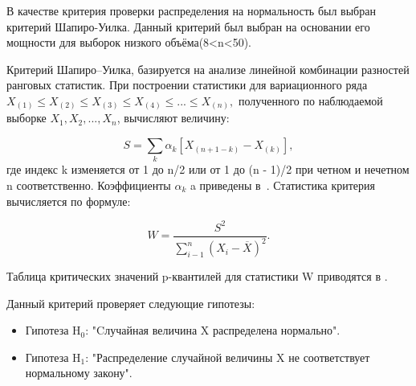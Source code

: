 В качестве критерия проверки распределения на нормальность был выбран критерий Шапиро-Уилка. Данный критерий был выбран на основании его мощности для выборок низкого объёма(8<n<50)\cite{Shapiro}.

Критерий Шапиро–Уилка, базируется на анализе линейной
комбинации разностей ранговых статистик. При построении статистики для вариационного ряда $ X_{(1)} \leq X_{(2)} \leq X_{(3)} \leq X_{(4)} \leq ... \leq X_{(n)}, $ полученного по наблюдаемой выборке $X_{1}, X_{2}, ... , X_{n}$, вычисляют величину\cite{RANstat}:

\begin{equation} \label{eq:Shapiro_S}
	S = \sum_{k}\alpha_{k}[X_{(n+1-k)} - X_{(k)}],
\end{equation}
где индекс k изменяется от 1 до n/2 или от 1 до (n - 1)/2 при четном и нечетном n соответственно. Коэффициенты $\alpha_{k}$ a приведены в~\cite{Shapiro}.
Статистика критерия вычисляется по формуле:

\begin{equation} \label{eq:Shapiro_W}
	W = \frac{S^2}{\sum_{i-1}^{n}(X_{i}-\overline{X})^2}.
\end{equation}

Таблица критических значений p-квантилей для статистики W приводятся в \cite{shapiro_GOST}.

Данный критерий проверяет следующие гипотезы:
\begin{itemize}
	\item Гипотеза H$_{0}$: "Cлучайная величина X распределена нормально".
	\item Гипотеза H$_{1}$: "Распределение случайной величины X не соответствует нормальному закону". 
\end{itemize}

